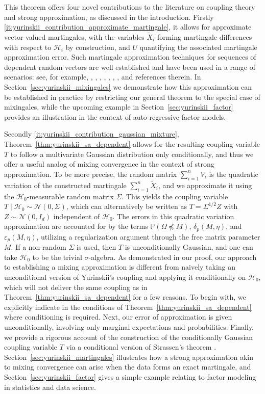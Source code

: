 \documentclass[11pt,lof]{puthesis}
\renewcommand{\P}{\ensuremath{\mathbb{P}}}
\newcommand{\cH}{\ensuremath{\mathcal{H}}}
\newcommand{\cN}{\ensuremath{\mathcal{N}}}
\theoremstyle{break}
\theoremstyle{proof}
\begin{document}
This theorem offers four novel contributions to the literature on coupling
theory and strong approximation, as discussed in the introduction.
Firstly \ref{it:yurinskii_contribution_approximate_martingale}, it allows for
approximate vector-valued martingales, with the variables $\tilde X_i$ forming
martingale differences with respect to $\cH_i$ by construction, and $U$
quantifying the associated martingale approximation error. Such martingale
approximation techniques for sequences of dependent random vectors are well
established and have been used in a range of scenarios: see, for example,
\citet{wu2004martingale}, \citet{dedecker2007weak}, \citet{zhao2008martingale},
\citet{peligrad2010conditional}, \citet{atchade2014martingale},
\citet{cuny2014martingale}, \citet{magda2018martingale}, and references
therein. In Section~\ref{sec:yurinskii_mixingales} we demonstrate how this
approximation can be established in practice by restricting our general theorem
to the special case of mixingales, while the upcoming example in
Section~\ref{sec:yurinskii_factor} provides an illustration in the context of
auto-regressive factor models.

Secondly \ref{it:yurinskii_contribution_gaussian_mixture},
Theorem~\ref{thm:yurinskii_sa_dependent} allows for the
resulting coupling variable $T$
to follow a multivariate Gaussian distribution only conditionally,
and thus we offer a useful analog of mixing convergence in the context
of strong approximation.
To be more precise, the random matrix $\sum_{i=1}^{n} V_i$
is the quadratic variation of the constructed martingale
$\sum_{i=1}^n \tilde X_i$, and we approximate it using the $\cH_0$-measurable
random matrix $\Sigma$. This yields the coupling variable
$T \mid \cH_0 \sim \cN(0, \Sigma)$, which can alternatively be written as
$T=\Sigma^{1/2} Z$ with $Z \sim \cN(0,I_d)$ independent of $\cH_0$.
The errors in this quadratic variation
approximation are accounted for by the terms
$\P(\Omega \npreceq M)$, $\delta_p(M, \eta)$, and $\varepsilon_p(M, \eta)$,
utilizing a regularization argument through the free matrix parameter $M$.
If a non-random $\Sigma$ is used, then $T$ is unconditionally Gaussian,
and one can take $\cH_0$ to be the trivial $\sigma$-algebra.
As demonstrated in our proof, our approach to establishing a
mixing approximation is different from naively taking an unconditional version
of Yurinskii's coupling and applying
it conditionally on $\cH_0$, which will not deliver the same coupling as in
Theorem~\ref{thm:yurinskii_sa_dependent} for a few reasons.
To begin with, we explicitly indicate in the
conditions of Theorem~\ref{thm:yurinskii_sa_dependent} where conditioning is
required.
Next, our error of approximation is given unconditionally,
involving only marginal expectations and probabilities.
Finally, we provide a rigorous account of the construction of the
conditionally Gaussian coupling variable $T$ via a conditional version
of Strassen's theorem \citep{chen2020jackknife}.
Section~\ref{sec:yurinskii_martingales}
illustrates how a strong approximation akin to
mixing convergence can arise when the data
forms an exact martingale, and Section~\ref{sec:yurinskii_factor} gives a
simple example
relating to factor modeling in statistics and data science.
\end{document}

